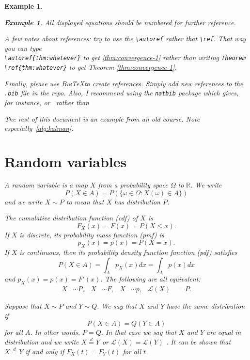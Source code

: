 \documentclass[10pt]{article}
\newtheorem{example}[ex]{Example}
\newcommand{\R}{\mathbb{R}}
\begin{document}
\begin{example}
\begin{example}
All displayed equations should be numbered for further reference. 

A few notes about references: try to use the \verb|\autoref| rather
that \verb|\ref|. That way you can type \\ \verb|\autoref{thm:whatever}|
to get \autoref{thm:convergence-1} rather than writing \verb|Theorem \ref{thm:whatever}| 
to get Theorem \ref{thm:convergence-1}. 

Finally, please use \textsc{Bib}\TeX to create references. Simply add
new references to the {\tt .bib} file in the repo. Also, I recommend
using the {\tt natbib} package which gives, for instance,
\citep{Vapnik1998} or~\citet{Vapnik1998} rather than~\cite{Vapnik1998}

The rest of this document is an example from an old course. Note
especially~\autoref{alg:kalman}.

\section{Random variables}


A {\em random variable} is a map $X$ from a probability space $\Omega$ to $\R$. We write
\begin{equation}
  P(X\in A)=P(\{\omega\in\Omega : X(\omega)\in A\})\label{eq:1}
\end{equation}
and we write $X \sim P$ to mean that $X$ has distribution $P$. 

The {\em cumulative distribution function} (cdf) of $X$ is
\begin{equation}
  F_X(x) = F(x) = P(X \leq x).\label{eq:2}
\end{equation}
If $X$ is discrete, its probability mass function (pmf) is
\begin{equation}
p_X(x) = p(x) = P(X = x).\label{eq:3}
\end{equation}
If $X$ is continuous, then its probability density function function (pdf) satisfies
\begin{equation}
P(X \in A) = \int_A p_X(x)dx = \int_A p(x)dx\label{eq:4}
\end{equation}
and $p_X(x) = p(x) = F'(x)$. The following are all equivalent:
\begin{align}
  X&\sim P,& X&\sim F, & X&\sim p, & \mathcal{L}(X)&=P.
\end{align}

Suppose that $X \sim P$ and $Y \sim Q$. We say that $X$ and $Y$ have
the same distribution if
\begin{equation}
  P(X\in A)=Q(Y \in A)\label{eq:5}
\end{equation}
for all $A$. In other words, $P = Q$. In that case we say that $X$ and
$Y$ are equal in distribution and we write $X \overset{d}{=} Y$ or
$\mathcal{L}(X) = \mathcal{L}(Y)$ . It can be shown that $X
\overset{d}{=} Y$ if and only if 
$F_X(t) = F_Y (t)$ for all $t$.


\end{example}
\end{example}
\end{document}
